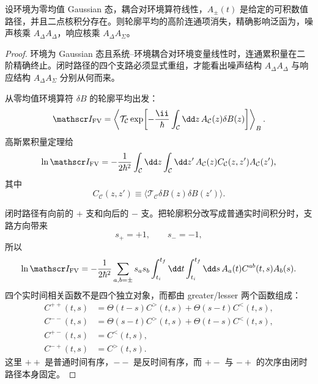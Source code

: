 \begin{theorem}
设环境为零均值 Gaussian 态，耦合对环境算符线性，$A_\pm(t)$ 是给定的可积数值路径，并且二点核积分存在。则轮廓平均的高阶连通项消失，精确影响泛函为，噪声核乘 $A_\Delta A_\Delta$，响应核乘 $A_\Delta A_\Sigma$。
\end{theorem}
\begin{proof}
环境为 Gaussian 态且系统--环境耦合对环境变量线性时，连通累积量在二阶精确终止。闭时路径的四个支路必须显式重组，才能看出噪声结构 $A_\Delta A_\Delta$ 与响应结构 $A_\Delta A_\Sigma$ 分别从何而来。

从零均值环境算符 $\delta B$ 的轮廓平均出发：
\begin{equation*}
\mathscr I_{\rm FV}
=\left\langle\mathcal T_{\mathcal C}
\exp\!\left[-\frac{\ii}{\hbar}
\int_{\mathcal C}\dd z\,A_{\mathcal C}(z)\delta B(z)\right]
\right\rangle_B.
\end{equation*}
高斯累积量定理给
\begin{equation*}
\ln\mathscr I_{\rm FV}
=-\frac{1}{2\hbar^2}
\int_{\mathcal C}\dd z\int_{\mathcal C}\dd z'\,
A_{\mathcal C}(z)
C_{\mathcal C}(z,z')
A_{\mathcal C}(z'),
\end{equation*}
其中
\begin{equation*}
C_{\mathcal C}(z,z')
\equiv\langle\mathcal T_{\mathcal C}\delta B(z)\delta B(z')\rangle.
\end{equation*}

闭时路径有向前的 $+$ 支和向后的 $-$ 支。把轮廓积分改写成普通实时间积分时，支路方向带来
\begin{equation*}
s_+=+1,
\qquad
s_-=-1,
\end{equation*}
所以
\begin{equation*}
\ln\mathscr I_{\rm FV}
=-\frac{1}{2\hbar^2}
\sum_{a,b=\pm}s_a s_b
\int_{t_i}^{t_f}\dd t\int_{t_i}^{t_f}\dd s\,
A_a(t)C^{ab}(t,s)A_b(s).
\end{equation*}
四个实时间相关函数不是四个独立对象，而都由 greater/lesser 两个函数组成：
\begin{align*}
C^{++}(t,s)
&=\Theta(t-s)C^>(t,s)+\Theta(s-t)C^<(t,s),\\
C^{--}(t,s)
&=\Theta(s-t)C^>(t,s)+\Theta(t-s)C^<(t,s),\\
C^{+-}(t,s)&=C^<(t,s),\\
C^{-+}(t,s)&=C^>(t,s).
\end{align*}
这里 $++$ 是普通时间有序，$--$ 是反时间有序，而 $+-$ 与 $-+$ 的次序由闭时路径本身固定。


\end{proof}
